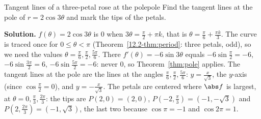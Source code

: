 \documentclass[11pt]{article}
\begin{document}
\begin{exmp}{Tangent lines of a three-petal rose at the pole}{pole}
Find the tangent lines at the pole of $r=2\cos3\theta$ and mark the tips of the petals.

\textbf{Solution.} $f(\theta)=2\cos3\theta$ is $0$ when $3\theta=\frac\pi2+\pi k$, that is $\theta=\frac\pi6+\frac{\pi k}3$. The curve is traced once for $0\le\theta<\pi$ (Theorem~\ref{12.2-thm:period}: three petals, odd), so we need the values $\theta=\frac\pi6,\frac\pi2,\frac{5\pi}6$. There $f'(\theta)=-6\sin3\theta$ equals $-6\sin\frac\pi2=-6$, $-6\sin\frac{3\pi}2=6$, $-6\sin\frac{5\pi}2=-6$: never $0$, so Theorem~\ref{thm:pole} applies. The tangent lines at the pole are the lines at the angles $\frac\pi6,\frac\pi2,\frac{5\pi}6$: $y=\frac{x}{\sqrt3}$, the $y$-axis (since $\cos\frac\pi2=0$), and $y=-\frac x{\sqrt3}$. The petals are centered where $\abs f$ is largest, at $\theta=0,\frac\pi3,\frac{2\pi}3$: the tips are $P(2,0)=(2,0)$, $P\left(-2,\frac\pi3\right)=\left(-1,-\sqrt3\right)$ and $P\left(2,\frac{2\pi}3\right)=\left(-1,\sqrt3\right)$, the last two because $\cos\pi=-1$ and $\cos2\pi=1$.

\begin{center}
\end{center}
\end{exmp}
\end{document}

